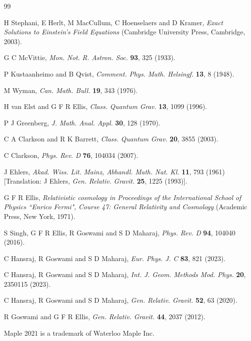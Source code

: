 \documentclass[abstract=on,notitlepage,superscriptaddress,nofootinbib,aps,preprint,prd]{revtex4}
\newcommand{\0}{^{(0)}}
\newcommand{\1}{^{(1)}}
\newcommand{\2}{^{(2)}}
\newcommand{\3}{{}^{(3)}}
\begin{document}




\begin{thebibliography}{99}

 H Stephani, E Herlt, M MacCullum, C Hoenselaers and D Kramer, {\it Exact Solutions to Einstein’s Field Equations} (Cambridge University Press, Cambridge, 2003).

 G C McVittie, \textit{Mon. Not. R. Astron. Soc.} \textbf{93}, 325 (1933).

 P Kustaanheimo and B Qvist, \textit{Comment. Phys. Math. Helsingf.} \textbf{13}, 8 (1948).

 M Wyman, \textit{Can. Math. Bull.} \textbf{19}, 343 (1976).

 H van Elst and G F R Ellis, \textit{Class. Quantum Grav.} \textbf{13}, 1099 (1996).

 P J Greenberg, \textit{J. Math. Anal. Appl.} \textbf{30}, 128 (1970).

 C A Clarkson and R K Barrett,  \textit{Class. Quantum Grav.} \textbf{20}, 3855 (2003).

 C Clarkson,  \textit{Phys. Rev. D} \textbf{76}, 104034 (2007).

 J Ehlers,  \textit{Akad. Wiss. Lit. Mainz, Abhandl. Math. Nat. Kl.} \textbf{11}, 793 (1961) [Translation: J Ehlers, \textit{Gen. Relativ. Gravit.} \textbf{25}, 1225 (1993)].

 G F R Ellis,  \textit{Relativistic cosmology in Proceedings of the International School of Physics ``Enrico Fermi", Course 47: General Relativity and Cosmology} (Academic Press, New York, 1971).

 S Singh, G F R Ellis, R Goswami and S D Maharaj, \textit{Phys. Rev. D} \textbf{94}, 104040 (2016).

 C Hansraj,  R Goswami and S D Maharaj,  \textit{Eur. Phys. J. C} \textbf{83}, 821 (2023).

 C Hansraj, R Goswami and S D Maharaj, \textit{Int. J. Geom. Methods Mod. Phys.} \textbf{20}, 2350115 (2023).

 C Hansraj,  R Goswami and S D Maharaj,  \textit{Gen. Relativ. Gravit.} \textbf{52}, 63 (2020).



 R Goswami and G F R Ellis, \textit{Gen. Relativ. Gravit.} \textbf{44}, 2037 (2012).

 Maple 2021 is a trademark of Waterloo Maple Inc.
	
	
\end{thebibliography}
\end{document}
